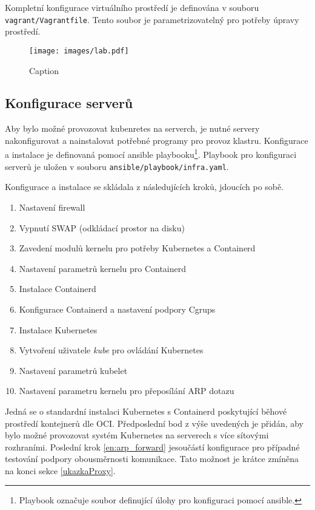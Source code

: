 Kompletní konfigurace virtuálního prostředí je definována v souboru \verb|vagrant/Vagrantfile|. Tento soubor je parametrizovatelný pro potřeby úpravy prostředí. 
\begin{figure}[ht]
    \centering
    \texttt{[image: images/lab.pdf]}
    \caption{Caption}
    \label{fig:lab}
\end{figure}

\subsection{Konfigurace serverů}
Aby bylo možné provozovat kubenretes na serverch, je nutné servery nakonfigurovat a nainstalovat potřebné programy pro provoz klastru. Konfigurace a instalace je definovaná pomocí ansible playbooku\footnote{Playbook označuje soubor definující úlohy pro konfiguraci pomocí ansible.}. Playbook pro konfiguraci serverů je uložen v souboru \verb|ansible/playbook/infra.yaml|.

Konfigurace a instalace se skládala z následujících kroků, jdoucích po sobě.
\begin{enumerate}
    \item Nastavení firewall
    \item Vypnutí SWAP (odkládací prostor na disku)
    \item Zavedení modulů kernelu pro potřeby Kubernetes a Containerd
    \item Nastavení parametrů kernelu pro Containerd
    \item Instalace Containerd
    \item Konfigurace Containerd a nastavení podpory Cgrups
    \item Instalace Kubernetes
    \item Vytvoření uživatele \textit{kube} pro ovládání Kubernetes
    \item Nastavení parametrů kubelet\label{en:ip_set}
    \item Nastavení parametru kernelu pro přeposílání ARP dotazu\label{en:arp_forward}
\end{enumerate}
Jedná se o standardní instalaci Kubernetes s Containerd poskytující běhové prostředí kontejnerů dle OCI. Předposlední bod z výše uvedených je přidán, aby bylo možné provozovat systém Kubernetes na serverech s více sítovými rozhraními. Poslední krok \ref{en:arp_forward} jesoučástí konfigurace pro případné testování podpory obousměrnosti komunikace. Tato možnost je krátce zmíněna na konci sekce \ref{ukazkaProxy}.

